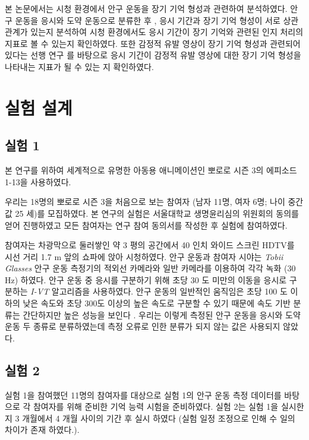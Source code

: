 \documentclass{kcc}
\begin{document}
본 논문에서는 시청 환경에서 안구 운동을 장기 기억 형성과 관련하여 분석하였다. 안구 운동을 응시와 도약 운동으로 분류한 후 \cite{Findlay1999,Feng2003,Feng2006}, 응시 기간과 장기 기억 형성이 서로 상관 관계가 있는지 분석하여 시청 환경에서도 응시 기간이 장기 기억와 관련된 인지 처리의 지표로 볼 수 있는지 확인하였다. 또한 감정적 유발 영상이 장기 기억 형성과 관련되어 있다는 선행 연구 \cite{Cahill1996amyg,Cahill1998baso}를 바탕으로 응시 기간이 감정적 유발 영상에 대한 장기 기억 형성을 나타내는 지표가 될 수 있는 지 확인하였다. 

\section{실험 설계}

\subsection{실험 1}
본 연구를 위하여 세계적으로 유명한 아동용 애니메이션인 뽀로로 시즌 3의 에피소드 1-13을 사용하였다. 

우리는 18명의 뽀로로 시즌 3을 처음으로 보는 참여자 (남자 11명, 여자 6명; 나이 중간 값 25 세)를 모집하였다. 본 연구의 실험은 서울대학교 생명윤리심의 위원회의 동의를 얻어 진행하였고 모든 참여자는 연구 참여 동의서를 작성한 후 실험에 참여하였다.

참여자는 차광막으로 둘러쌓인 약 3 평의 공간에서 40 인치 와이드 스크린 HDTV를 시선 거리 1.7 m 앞의 쇼파에 앉아 시청하였다. 안구 운동과 참여자 시야는 \textit{Tobii Glasses} 안구 운동 측정기의 적외선 카메라와 일반 카메라를 이용하여 각각 녹화 (30 Hz) 하였다. 안구 운동 중 응시를 구분하기 위해 초당 30 도 미만의 이동을 응시로 구분하는 \textit{I-VT} 알고리즘을 사용하였다. 안구 운동의 일반적인 움직임은 초당 100 도 이하의 낮은 속도와 초당 300도 이상의 높은 속도로 구분할 수 있기 때문에 속도 기반 분류는 간단하지만 높은 성능을 보인다 \cite{Salvucci2000}. 우리는 이렇게 측정된 안구 운동을 응시와 도약 운동 두 종류로 분류하였는데 측정 오류로 인한 분류가 되지 않는 값은 사용되지 않았다. 


\subsection{실험 2}
\label{subsec:experiment2}
실험 1을 참여했던 11명의 참여자를 대상으로 실험 1의 안구 운동 측정 데이터를 바탕으로 각 참여자를 위해 준비한 기억 능력 시험을 준비하였다. 실험 2는 실험 1을 실시한 지 3 개월에서 4 개월 사이의 기간 후 실시 하였다 (실험 일정 조정으로 인해 수 일의 차이가 존재 하였다.).
\end{document}
